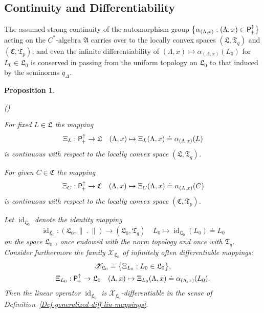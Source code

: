 \documentclass[11pt,twoside,openright]{report}
\theoremstyle{definition}
\theoremstyle{plain}
\newtheorem{Pro}[Def]{Proposition}
\theoremstyle{remark}
\theoremstyle{assumption}
\DeclareMathOperator{\id}{id}
\newcommand{\bset}[1]{\bigl\{ #1 \bigr\}}
\newcommand{\norm}[1]{\lVert #1 \rVert}
\newcommand{\qD}{q_\Delta}
\newcommand{\Afrak}{\mathfrak{A}}
\newcommand{\Cfrak}{\mathfrak{C}}
\newcommand{\Lfrak}{\mathfrak{L}}
\newcommand{\Tfrak}{\mathfrak{T}}
\newcommand{\Xscr}{\mathscr{X}}
\newcommand{\Poin}{\mathsf{P}_{\negthinspace +}^\uparrow}
\newcommand{\aLax}{\alpha_{( \Lambda , x )}}
\newcounter{propitem}
\newenvironment{proplist}{\begin{list}{(\roman{propitem})}%
  {\usecounter{propitem} \setlength{\topsep}{0ex}%
   \setlength{\parsep}{0.2ex} \setlength{\itemsep}{0.4ex}%
   \setlength{\leftmargin}{0em} \setlength{\itemindent}{0.5em}%
   }}{\end{list}}
\begin{document}
\subsection{Continuity and Differentiability}

The assumed strong continuity of the automorphism group $\bset{\aLax :
( \Lambda , x ) \in \Poin}$ acting on the $C^*$-algebra $\Afrak$
carries over to the locally convex spaces $( \Lfrak , \Tfrak_q )$ and
$( \Cfrak , \Tfrak_p )$; and even the infinite differentiability of $(
\Lambda , x ) \mapsto \aLax ( L_0 )$ for $L_0 \in \Lfrak_0$ is
conserved in passing from the uniform topology on $\Lfrak_0$ to that
induced by the seminorms $\qD$.
\begin{Pro}
  \label{Pro-lcs-continuity-differentiability}
  \begin{proplist}
  \item For fixed $L \in \Lfrak$ the mapping
    \begin{equation*}
      \Xi_L : \Poin \rightarrow \Lfrak \quad ( \Lambda , x ) \mapsto
      \Xi_L ( \Lambda , x ) \doteq \aLax ( L )
    \end{equation*}
    is continuous with respect to the locally convex space $( \Lfrak ,
    \Tfrak_q )$.
  \item For given $C \in \Cfrak$ the mapping
    \begin{equation*}
      \Xi_C : \Poin \rightarrow \Cfrak \quad ( \Lambda , x ) \mapsto
      \Xi_C ( \Lambda , x ) \doteq \aLax ( C )
    \end{equation*}
    is continuous with respect to the locally convex space $( \Cfrak ,
    \Tfrak_p )$.
  \item Let $\id_{\Lfrak_0}$ denote the identity mapping
    \begin{equation*}
      \id_{\Lfrak_0} : ( \Lfrak_0 , \norm{~.~} ) \rightarrow (
      \Lfrak_0 , \Tfrak_q ) \quad L_0 \mapsto \id_{\Lfrak_0} ( L_0 )
      \doteq L_0
    \end{equation*}
    on the space $\Lfrak_0$ , once endowed with the norm topology and
    once with $\Tfrak_q$. Consider furthermore the family
    $\Xscr_{\Lfrak_0}$ of infinitely often differentiable mappings:
    \begin{gather*}
      \Xscr_{\Lfrak_0} \doteq \bset{\Xi_{L_0} : L_0 \in \Lfrak_0}
      \text{,} \\
      \Xi_{L_0} : \Poin \rightarrow \Lfrak_0 \quad ( \Lambda , x )
      \mapsto \Xi_{L_0} ( \Lambda , x ) \doteq \aLax ( L_0 ) \text{.}
    \end{gather*}
    Then the linear operator $\id_{\Lfrak_0}$ is
    $\Xscr_{\Lfrak_0}$-differentiable in the sense of
    Definition~\ref{Def-generalized-diff-lin-mappings}.
  \end{proplist}
\end{Pro}
\end{document}

